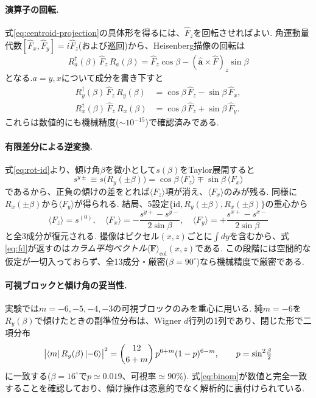 \documentclass[11pt]{ltjsarticle}
\newcommand{\Fv}{\bm{F}}
\newcommand{\expv}[1]{\langle #1 \rangle}
\begin{document}
\paragraph{演算子の回転.}
式\eqref{eq:centroid-projection}の具体形を得るには、$\hat F_z$を回転させればよい.
角運動量代数$[\hat F_x,\hat F_y]=i\hat F_z$(および巡回)から、Heisenberg描像の回転は
\begin{equation}
  R_a^\dagger(\beta)\,\hat F_z\,R_a(\beta)
  =\hat F_z\cos\beta-(\hat{\bm a}\times\hat F)_z\sin\beta
\end{equation}
となる.$a=y,x$について成分を書き下すと
\begin{align}
  R_y^\dagger(\beta)\,\hat F_z\,R_y(\beta)&=\cos\beta\,\hat F_z-\sin\beta\,\hat F_x,\\
  R_x^\dagger(\beta)\,\hat F_z\,R_x(\beta)&=\cos\beta\,\hat F_z+\sin\beta\,\hat F_y.
  \label{eq:rot-id}
\end{align}
これらは数値的にも機械精度($\sim10^{-15}$)で確認済みである.

\paragraph{有限差分による逆変換.}
式\eqref{eq:rot-id}より、傾け角$\beta$を微小として$s(\beta)$をTaylor展開すると
\begin{equation}
  s^{y\pm}\equiv s\bigl(R_y(\pm\beta)\bigr)=\cos\beta\,\expv{F_z}\mp\sin\beta\,\expv{F_x}
\end{equation}
であるから、正負の傾けの差をとれば$\expv{F_z}$項が消え、$\expv{F_x}$のみが残る.
同様に$R_x(\pm\beta)$から$\expv{F_y}$が得られる.
結局、5設定$\{\mathrm{id},R_y(\pm\beta),R_x(\pm\beta)\}$の重心から
\begin{equation}
  \boxed{\;
  \expv{F_z}=s^{(0)},\quad
  \expv{F_x}=-\frac{s^{y+}-s^{y-}}{2\sin\beta},\quad
  \expv{F_y}=+\frac{s^{x+}-s^{x-}}{2\sin\beta}
  \;}
  \label{eq:fd}
\end{equation}
と全3成分が復元される.
撮像はピクセル$(x,z)$ごとに$\int dy$を含むから、式\eqref{eq:fd}が返すのは\emph{カラム平均ベクトル}$\expv{\Fv}_{\mathrm{col}}(x,z)$である.
この段階には空間的な仮定が一切入っておらず、全13成分・厳密($\beta=90^\circ$)なら機械精度で厳密である.

\paragraph{可視ブロックと傾け角の妥当性.}
実験では$m=-6,-5,-4,-3$の可視ブロックのみを重心に用いる.
純$m=-6$を$R_y(\beta)$で傾けたときの副準位分布は、Wigner $d$行列の1列であり、閉じた形で二項分布
\begin{equation}
  \bigl|\bra{m}R_y(\beta)\ket{-6}\bigr|^2
  =\binom{12}{6+m}\,p^{6+m}(1-p)^{6-m},\qquad p=\sin^2\!\tfrac{\beta}{2}
  \label{eq:binom}
\end{equation}
に一致する($\beta=16^\circ$で$p\simeq0.019$、可視率$\simeq90\%$).
式\eqref{eq:binom}が数値と完全一致することを確認しており、傾け操作は恣意的でなく解析的に裏付けられている.
\end{document}

